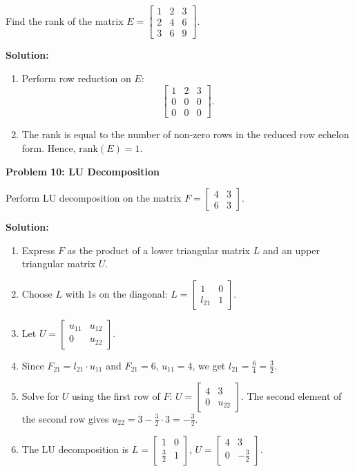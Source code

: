 \documentclass[8pt, a4paper, landscape]{extarticle}
\begin{document}
\begin{multicols*}{3}
  Find the rank of the matrix $E = \begin{bmatrix} 1 & 2 & 3 \\ 2 & 4 & 6 \\ 3 & 6 & 9 \end{bmatrix}$.

  \textbf{Solution:}
  \begin{enumerate}
    \item Perform row reduction on $E$:
          \[
            \begin{bmatrix}
              1 & 2 & 3 \\
              0 & 0 & 0 \\
              0 & 0 & 0
            \end{bmatrix}.
          \]
    \item The rank is equal to the number of non-zero rows in the reduced row echelon form. Hence, $\text{rank}(E) = 1$.
  \end{enumerate}

  \textbf{Problem 10: LU Decomposition}

  Perform LU decomposition on the matrix $F = \begin{bmatrix} 4 & 3 \\ 6 & 3 \end{bmatrix}$.

  \textbf{Solution:}
  \begin{enumerate}
    \item Express $F$ as the product of a lower triangular matrix $L$ and an upper triangular matrix $U$.
    \item Choose $L$ with 1s on the diagonal: $L = \begin{bmatrix} 1 & 0 \\ l_{21} & 1 \end{bmatrix}$.
    \item Let $U = \begin{bmatrix} u_{11} & u_{12} \\ 0 & u_{22} \end{bmatrix}$.
    \item Since $F_{21} = l_{21} \cdot u_{11}$ and $F_{21} = 6$, $u_{11} = 4$, we get $l_{21} = \frac{6}{4} = \frac{3}{2}$.
    \item Solve for $U$ using the first row of $F$: $U = \begin{bmatrix} 4 & 3 \\ 0 & u_{22} \end{bmatrix}$. The second element of the second row gives $u_{22} = 3 - \frac{3}{2} \cdot 3 = -\frac{3}{2}$.
    \item The LU decomposition is $L = \begin{bmatrix} 1 & 0 \\ \frac{3}{2} & 1 \end{bmatrix}$, $U = \begin{bmatrix} 4 & 3 \\ 0 & -\frac{3}{2} \end{bmatrix}$.
  \end{enumerate}


\end{multicols*}
\end{document}
